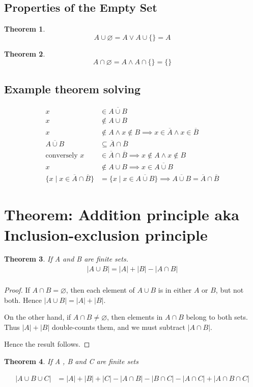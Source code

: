 \documentclass{article}  %
\newtheorem{theorem}{Theorem}[section]
\theoremstyle{definition}
\begin{document}
\subsection{Properties of the Empty Set}


\begin{theorem}
    \[
        A \cup \varnothing = A \lor A \cup \{\} = A
    \]
\end{theorem}

\begin{theorem}
    \[
        A \cap \varnothing = A \land A \cap \{\} = \{\}
    \]
\end{theorem}



\subsection{Example theorem solving}

\[
\begin{aligned}
    x &\in \overline{A \cup B}\\
    x &\notin A \cup B\\
    x &\notin A \land x \notin B \implies x \in \overline{A} \land x \in \overline{B} \\
    \overline{A \cup B} &\subseteq \overline{A} \cap \overline{B}\\
    \text{conversely } x &\in \overline{A} \cap \overline{B} \implies x \notin A \land x \notin B\\
    x &\notin A \cup B \implies x \in \overline{A \cup B}\\
    \{x \mid x \in \overline{A} \cap \overline{B}\} &= \{x \mid x \in \overline{A \cup B}\} \implies
        \overline{A \cup B} = \overline{A} \cap \overline{B}
\end{aligned}
\]

\section{Theorem:  Addition principle aka Inclusion-exclusion principle}

\begin{theorem}
If A and B are finite sets.
\[
    \begin{aligned}
        |A \cup B| = |A| + |B| - |A \cap B|\\
    \end{aligned}
\]
\end{theorem}

\begin{proof}
If \(A \cap B = \varnothing\), then each element of \(A \cup B\) is in either \(A\) or \(B\), but not both.
Hence \(\displaystyle |A \cup B| = |A| + |B|\).

On the other hand, if \(A \cap B \neq \varnothing\), then elements in \(A \cap B\) belong to both sets. Thus
\(\displaystyle |A| + |B|\) double-counts them, and we must subtract \(\displaystyle |A \cap B|\).

Hence the result follows.
\end{proof}


\begin{theorem}
If A , B and C are finite sets

\[
    \begin{aligned}
        |A \cup B \cup C| &= |A| + |B| + |C| - |A \cap B| - |B \cap C| - |A \cap C| + |A \cap B \cap C|
    \end{aligned}
\]
\end{theorem}
\end{document}
